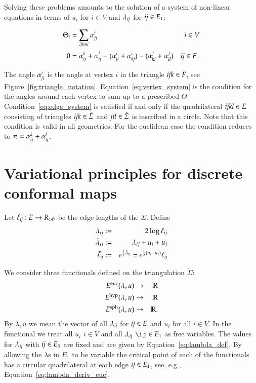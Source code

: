 \documentclass[Thesis]{subfiles}
\begin{document}
Solving these problems amounts to the solution of a system of non-linear equations in terms of $u_i$ for $i\in V$ and $\lambda_{\it ij}$ for $\it ij \in E_1$:

\begin{align}
	\Theta_i &=\sum_{\it ijk \ni i}\alpha_{\it ji}^i & i\in V\label{eq:vertex_system}\\
	0 &= \alpha_{\it ij}^k + \alpha_{\it ij}^l - (\alpha^i_{\it jl} + \alpha^i_{\it kj}) - (\alpha^j_{\it ki} + \alpha^j_{\it il}) & \textit{ij} \in E_1\label{eq:edge_system}
\end{align}

The angle $\alpha_{\it ji}^i$ is the angle at vertex $i$ in the triangle $\it ijk\in F$, see Figure~\ref{fig:triangle_notation}.
Equation~\ref{eq:vertex_system} is the condition for the angles around each vertex to sum up to a prescribed $\Theta$.
Condition~\ref{eq:edge_system} is satisfied if and only if the quadrilateral $\it ijkl\in \Sigma$ consisting of triangles $\it ijk\in \tilde \Sigma$ and $\it jil\in \tilde \Sigma$ is inscribed in a circle. Note that this condition is valid in all geometries. For the euclidean case the condition reduces to $\pi=\alpha_{\it ij}^k + \alpha_{\it ij}^l$.

\section{Variational principles for discrete conformal maps}
\label{sec:vari-princ}

\begin{definition}
Let $\ell_{\it ij}:E\to R_{>0}$ be the edge lengths of the $\tilde \Sigma$. Define
\begin{eqnarray*}
\lambda_{ij} &:=& 2\log \ell_{ij}\label{eq:lambda_def}\\
\tilde\lambda_{ij} &:=& \lambda_{ij}+u_i+u_j\\
\tilde \ell_{\it ij} &:=& e^{\frac{1}{2}\tilde \lambda_{\it ij}}=e^{\frac{1}{2}(u_i + u_j)}\ell_{\it ij}
\end{eqnarray*}
\end{definition}

We consider three functionals defined on the triangulation $\tilde \Sigma$:
\begin{eqnarray*}
	E^{\rm euc}(\lambda,u) &\to& \mathbb R\\
	E^{\rm hyp}(\lambda,u) &\to& \mathbb R\\
	E^{\rm sph}(\lambda,u) &\to& \mathbb R.
\end{eqnarray*}
By $\lambda, u$ we mean the vector of all $\lambda_{\it ij}$ for $\it ij \in E$ and $u_i$ for all $i\in V$.
In the functional we treat all $u_i$ $i\in V$ and all $\lambda_{\it ij}$ $\ij \in E_1$ as free variables. The values for $\lambda_{\it ij}$ with $\it ij\in E_0$ are fixed and are given by Equation~\ref{eq:lambda_def}. By allowing the $\lambda$s in $E_1$ to be variable the critical point of each of the functionals has a circular quadrilateral at each edge $\it ij\in E_1$, see, e.g., Equation~\ref{eq:lambda_deriv_euc}.
\end{document}
